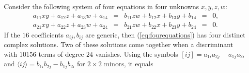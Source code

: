 \documentclass[12pt]{article}
\theoremstyle{definition}
\begin{document}
Consider the following system of four equations in four unknowns $x,y,z,w$:
\begin{equation}
\label{eq:fourequations}
\begin{matrix}
 a_{11} x y+a_{12} z+a_{13} w+a_{14}  &=&   b_{11} zw+b_{12} x+b_{13} y+b_{14} & = &  0, \\
 a_{21} x y+a_{22} z+a_{23} w+a_{24}  &=&   b_{21} zw+b_{22} x+b_{23} y+b_{24} & = & 0.
 \end{matrix}
 \end{equation}
 If the $16$ coefficients $a_{ij},b_{ij}$ are generic, then (\ref{eq:fourequations}) has four distinct complex solutions.
 Two of these solutions come together when a discriminant
with  $10156 $ terms of degree $24$ vanishes.
Using the symbols $[ij] = a_{1i} a_{2j} - a_{1j}a_{2i}$ and $\langle ij \rangle = b_{1i} b_{2j} - b_{1j}b_{2i}$ for $2 \times 2$ minors, it equals
\end{document}
